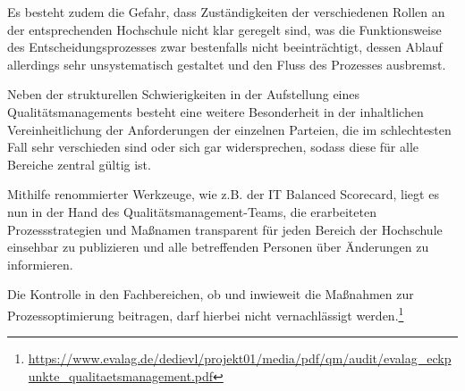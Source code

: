 Es besteht zudem die Gefahr, dass Zuständigkeiten der verschiedenen Rollen an der entsprechenden Hochschule nicht klar 
geregelt sind, was die Funktionsweise des Entscheidungsprozesses zwar bestenfalls nicht beeinträchtigt, dessen Ablauf allerdings 
sehr unsystematisch gestaltet und den Fluss des Prozesses ausbremst.

Neben der strukturellen Schwierigkeiten in der Aufstellung eines Qualitätsmanagements besteht eine weitere Besonderheit in der inhaltlichen Vereinheitlichung der Anforderungen der einzelnen Parteien, die im schlechtesten Fall sehr verschieden sind oder sich gar widersprechen, sodass diese für alle Bereiche zentral gültig ist. 

Mithilfe renommierter Werkzeuge, wie z.B. der IT Balanced Scorecard, liegt es nun in der Hand des Qualitätsmanagement-Teams, 
die erarbeiteten Prozessstrategien und Maßnamen transparent für jeden Bereich der Hochschule einsehbar zu publizieren und 
alle betreffenden Personen über Änderungen zu informieren. 

Die Kontrolle in den Fachbereichen, ob und inwieweit die 
Maßnahmen zur Prozessoptimierung beitragen, darf hierbei nicht vernachlässigt werden.\footnote{\url{https://www.evalag.de/dedievl/projekt01/media/pdf/qm/audit/evalag_eckpunkte_qualitaetsmanagement.pdf}}

